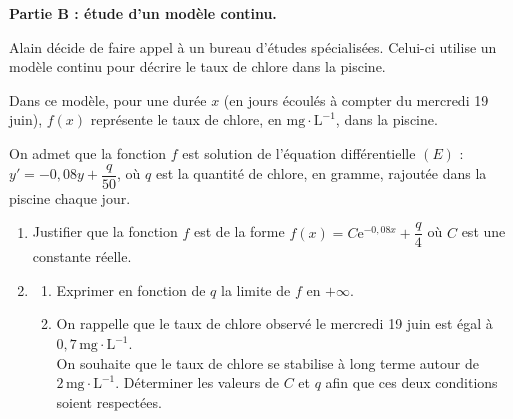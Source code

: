 \documentclass[10pt]{article}
\providecommand{\e}{{\mathrm{e}}}
\begin{document}
\medskip

\textbf{Partie B : étude d'un modèle continu.}

\smallskip

Alain décide de faire appel à un bureau d'études spécialisées. Celui-ci utilise un modèle continu pour décrire le taux de chlore dans la piscine.

Dans ce modèle, pour une durée $x$ (en jours écoulés à compter du mercredi 19 juin), $f(x)$ représente le taux de chlore, en $  \mathrm{mg}\cdot \mathrm{L}^{-1}$, dans la piscine.

On admet que la fonction $f$ est solution de l'équation différentielle $(E)$ : $y'=-0,08 y+\dfrac{q}{50}$, où $q$ est la quantité de chlore, en gramme, rajoutée dans la piscine chaque jour.

\begin{enumerate}
	\item Justifier que la fonction $f$ est de la forme $f(x)=C \e^{-0,08 x}+\dfrac{q}{4}$ où $C$ est une constante réelle.

	\item \begin{enumerate}
		\item  Exprimer en fonction de $q$ la limite de $f$ en $+\infty$.

		\item  On rappelle que le taux de chlore observé le mercredi 19 juin est égal à $0,7\, \mathrm{mg \cdot L}^{-1}$.\\ On souhaite que le taux de chlore se stabilise à long terme autour de $2\, \mathrm{mg \cdot L}^{-1}$. Déterminer les valeurs de $C$ et $q$ afin que ces deux conditions soient respectées.
	\end{enumerate}
\end{enumerate}

\medskip
\end{document}
